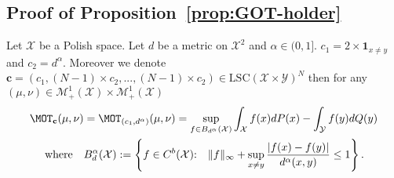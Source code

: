 \subsection{Proof of Proposition~\ref{prop:GOT-holder}}
\begin{prop*}
Let $\mathcal{X}$ be a Polish space. Let $d$ be a metric on $\mathcal{X}^2$ and $\alpha\in (0,1]$. $c_1= 2 \times \mathbf{1}_{x\neq y}$ and $c_2=d^{\alpha}$. Moreover we denote $\mathbf{c}=(c_1,(N-1)\times c_2,...,(N-1)\times c_2)\in \text{LSC}(\mathcal{X}\times\mathcal{Y})^N$
then for any $(\mu,\nu)\in\mathcal{M}_+^{1}(\mathcal{X})\times\mathcal{M}_+^{1}(\mathcal{X})$  
\begin{align*}
    \MOT_{\mathbf{c}}(\mu,\nu) &= \MOT_{(c_1,d^{\alpha})}(\mu,\nu)=\sup_{f\in B_{d^{\alpha}}(\mathcal{X})} \int_{\mathcal{X}} f(x) dP(x) - \int_{\mathcal{Y}} f(y) dQ(y)\\
    \text{where\quad}& B_d^{\alpha}(\mathcal{X}):=\left\{f\in C^{b}(\mathcal{X})\text{:}\quad \Vert f\Vert_{\infty}+\sup_{x\neq y}\frac{|f(x)-f(y)|}{d^{\alpha}(x,y)}\leq 1 \right\}.
\end{align*}
\end{prop*}
